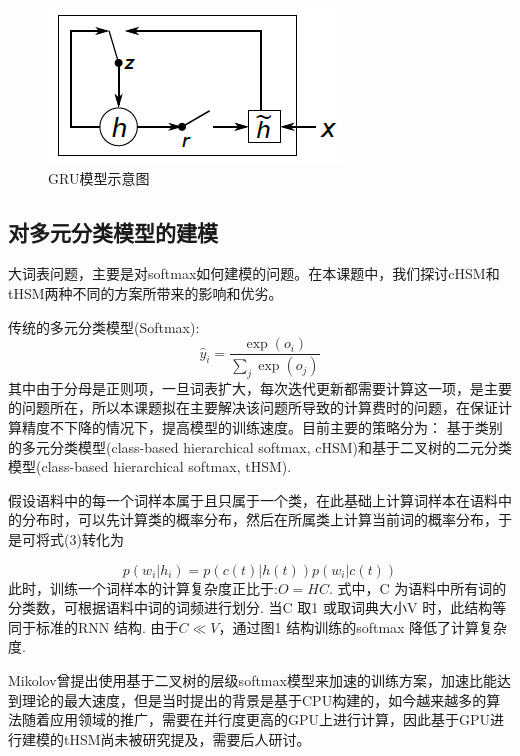 \documentclass[12pt,a4paper]{article}
\begin{document}
\begin{figure}
  \centering
  \includegraphics[width=0.6\linewidth]{./figures/gru.png}
  \caption{GRU模型示意图}\label{fig:gru}
\end{figure}


\subsection{对多元分类模型的建模}
大词表问题，主要是对softmax如何建模的问题。在本课题中，我们探讨cHSM和tHSM两种不同的方案所带来的影响和优劣。

传统的多元分类模型(Softmax):
\begin{equation}\label{equ:softmax}
  \hat y_i=\frac{\exp(o_i)}{\sum_j \exp(o_j)}
\end{equation}
其中由于分母是正则项，一旦词表扩大，每次迭代更新都需要计算这一项，是主要的问题所在，所以本课题拟在主要解决该问题所导致的计算费时的问题，在保证计算精度不下降的情况下，提高模型的训练速度。目前主要的策略分为： 基于类别的多元分类模型(class-based hierarchical softmax, cHSM)和基于二叉树的二元分类模型(class-based hierarchical softmax, tHSM).

假设语料中的每一个词样本属于且只属于一个类，在此基础上计算词样本在语料中的分布时，可以先计算类的概率分布，然后在所属类上计算当前词的概率分布，于是可将式(3)转化为

\begin{equation}\label{equ:class}
  p(w_i|h_i) = p(c(t)|h(t))p(w_i|c(t))
\end{equation}
此时，训练一个词样本的计算复杂度正比于:$O =HC$. 式中，C 为语料中所有词的分类数，可根据语料中词的词频进行划分. 当C 取1 或取词典大小V 时，此结构等同于标准的RNN 结构. 由于$C \ll V$，通过图1 结构训练的softmax 降低了计算复杂度.

Mikolov曾提出使用基于二叉树的层级softmax模型来加速的训练方案，加速比能达到理论的最大速度，但是当时提出的背景是基于CPU构建的，如今越来越多的算法随着应用领域的推广，需要在并行度更高的GPU上进行计算，因此基于GPU进行建模的tHSM尚未被研究提及，需要后人研讨。
\end{document}
